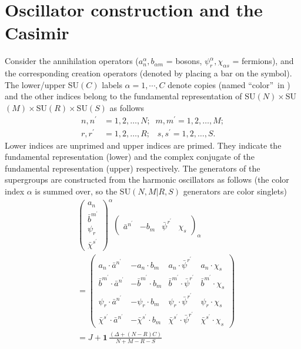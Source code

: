 \documentclass[a4paper,aps,preprint,nofootinbib]{revtex4}
\begin{document}
\section{Oscillator construction and the Casimir}

Consider the annihilation operators ($a_{n}^{\alpha},b_{\alpha m}$ = bosons,
$\psi_{r}^{\alpha},\chi_{\alpha s}$ = fermions), and the corresponding
creation operators (denoted by placing a bar on the symbol). The lower/upper
SU$\left( C\right) $ labels $\alpha=1,\cdots,C$ denote copies (named
\textquotedblleft color\textquotedblright\ in \cite{barsgunaydin}) and the
other indices belong to the fundamental representation of SU$\left( N\right)
\times$SU$\left( M\right) \times$SU$\left( R\right) \times$SU$\left(
S\right) $ as follows
\begin{align}
n,n^{\prime} & =1,2,\ldots,N;\;\;m,m^{\prime}=1,2,\ldots,M; \\
r,r^{\prime} & =1,2,\ldots,R;\;\;\;s,s^{\prime}=1,2,\ldots,S.
\end{align}
Lower indices are unprimed and upper indices are primed. They indicate the
fundamental representation (lower) and the complex conjugate of the
fundamental representation (upper) respectively. The generators of the
supergroups are constructed from the harmonic oscillators as follows (the
color index $\alpha$ is summed over, so the SU$\left( N,M|R,S\right) $
generators are color singlets)
\begin{align}
& \left(
\begin{array}{c}
a_{n} \\
\bar{b}^{m^{\prime}} \\
\psi_{r} \\
\bar{\chi}^{s^{\prime}}%
\end{array}
\right) ^{\alpha}\left(
\begin{array}{cccc}
\bar{a}^{n^{\prime}} & -b_{m} & \bar{\psi}^{r^{\prime}} & \chi_{s}%
\end{array}
\right) _{\alpha} \\
& =\left(
\begin{array}{cccc}
a_{n}\cdot\bar{a}^{n^{\prime}} & -a_{n}\cdot b_{m} & a_{n}\cdot\bar{\psi }
^{r^{\prime}} & a_{n}\cdot\chi_{s} \\
\bar{b}^{m^{\prime}}\cdot\bar{a}^{n^{\prime}} & -\bar{b}^{m^{\prime}}\cdot
b_{m} & \bar{b}^{m^{\prime}}\cdot\bar{\psi}^{r^{\prime}} & \bar{b}
^{m^{\prime }}\cdot\chi_{s} \\
\psi_{r}\cdot\bar{a}^{n^{\prime}} & -\psi_{r}\cdot b_{m} & \psi_{r}\cdot
\bar{\psi}^{r^{\prime}} & \psi_{r}\cdot\chi_{s} \\
\bar{\chi}^{s^{\prime}}\cdot\bar{a}^{n^{\prime}} & -\bar{\chi}
^{s^{\prime}}\cdot b_{m} & \bar{\chi}^{s^{\prime}}\cdot\bar{\psi}
^{r^{\prime}} & \bar {\chi}^{s^{\prime}}\cdot\chi_{s}%
\end{array}
\right) \\
& =J+\mathbf{1\,}\frac{\left( \Delta+\left( N-R\right) C\right) }{N+M-R-S}
\label{J}
\end{align}
\end{document}
